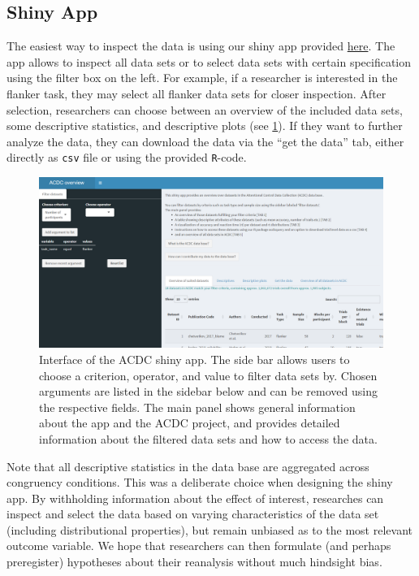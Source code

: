 \documentclass[
  man,floatsintext]{apa6}
\begin{document}
\hypertarget{shiny-app}{%
\subsection{Shiny App}\label{shiny-app}}

The easiest way to inspect the data is using our shiny app provided \href{https://mfhcgn.shinyapps.io/acdc-database/}{here}. The app allows to inspect all data sets or to select data sets with certain specification using the filter box on the left. For example, if a researcher is interested in the flanker task, they may select all flanker data sets for closer inspection. After selection, researchers can choose between an overview of the included data sets, some descriptive statistics, and descriptive plots (see \ref{fig:figure3}). If they want to further analyze the data, they can download the data via the ``get the data'' tab, either directly as \texttt{csv} file or using the provided \texttt{R}-code.



\begin{figure}
\centering
\includegraphics{images/Shiny_interface.png}
\caption{\label{fig:figure3}Interface of the ACDC shiny app. The side bar allows users to choose a criterion, operator, and value to filter data sets by. Chosen arguments are listed in the sidebar below and can be removed using the respective fields. The main panel shows general information about the app and the ACDC project, and provides detailed information about the filtered data sets and how to access the data.}
\end{figure}

Note that all descriptive statistics in the data base are aggregated across congruency conditions. This was a deliberate choice when designing the shiny app. By withholding information about the effect of interest, researches can inspect and select the data based on varying characteristics of the data set (including distributional properties), but remain unbiased as to the most relevant outcome variable. We hope that researchers can then formulate (and perhaps preregister) hypotheses about their reanalysis without much hindsight bias.
\end{document}
